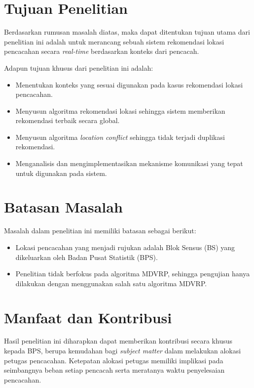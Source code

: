 \section{Tujuan Penelitian}
Berdasarkan rumusan masalah diatas, maka dapat ditentukan tujuan utama dari penelitian ini adalah untuk merancang sebuah sistem rekomendasi lokasi pencacahan secara \textit{real-time} berdasarkan konteks dari pencacah. 

Adapun tujuan khusus dari penelitian ini adalah:

\begin{itemize}
\item Menentukan konteks yang sesuai digunakan pada kasus rekomendasi lokasi pencacahan.
\item Menyusun algoritma rekomendasi lokasi sehingga sistem memberikan rekomendasi terbaik secara global.
\item Menyusun algoritma \textit{location conflict} sehingga tidak terjadi duplikasi rekomendasi.
\item Menganalisis dan mengimplementasikan mekanisme komunikasi yang tepat untuk digunakan pada sistem.
\end{itemize}


\section{Batasan Masalah}
Masalah dalam penelitian ini memiliki batasan sebagai berikut:

\begin{itemize}
\item Lokasi pencacahan yang menjadi rujukan adalah Blok Sensus (BS) yang dikeluarkan oleh Badan Pusat Statistik (BPS).
\item Penelitian tidak berfokus pada algoritma MDVRP, sehingga pengujian hanya dilakukan dengan menggunakan salah satu algoritma MDVRP.
\end{itemize}


\section{Manfaat dan Kontribusi}
Hasil penelitian ini diharapkan dapat memberikan kontribusi secara khusus kepada BPS, berupa kemudahan bagi \textit{subject matter} dalam melakukan alokasi petugas pencacahan. Ketepatan alokasi petugas memiliki implikasi pada seimbangnya beban setiap pencacah serta meratanya waktu penyelesaian pencacahan.

